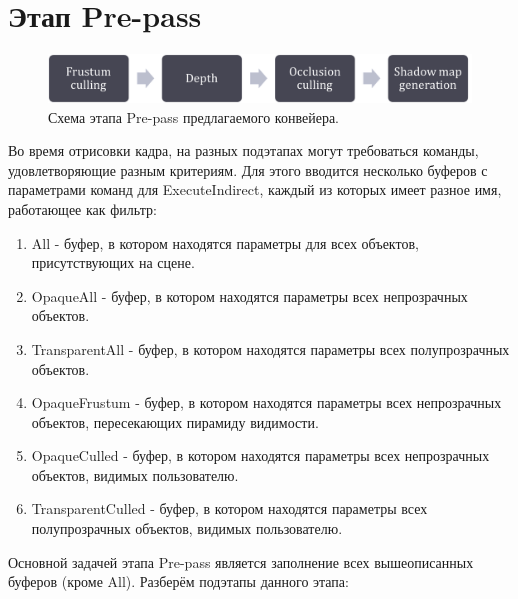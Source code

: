 \section{Этап Pre-pass} \label{ch3:pre_pass}
	\begin{figure}[ht!] 
		\center
		\includegraphics [scale=0.4] {my_folder/images//prepass_schema}	
		\caption{Схема этапа Pre-pass предлагаемого конвейера.} 
		\label{fig:prepass_schema}
	\end{figure}
	
	Во время отрисовки кадра, на разных подэтапах могут требоваться команды, удовлетворяющие разным критериям. Для этого вводится несколько буферов с параметрами команд для ExecuteIndirect, каждый из которых имеет разное имя, работающее как фильтр:
	\begin{enumerate}[1.]
		\item All - буфер, в котором находятся параметры для всех объектов, присутствующих на сцене.
		\item OpaqueAll - буфер, в котором находятся параметры всех непрозрачных объектов.
		\item TransparentAll - буфер, в котором находятся параметры всех полупрозрачных объектов.
		\item OpaqueFrustum - буфер, в котором находятся параметры всех непрозрачных объектов, пересекающих пирамиду видимости.
		\item OpaqueCulled - буфер, в котором находятся параметры всех непрозрачных объектов, видимых пользователю.
		\item TransparentCulled - буфер, в котором находятся параметры всех полупрозрачных объектов, видимых пользователю.
	\end{enumerate}
	
	Основной задачей этапа Pre-pass является заполнение всех вышеописанных буферов (кроме All). Разберём подэтапы данного этапа:
